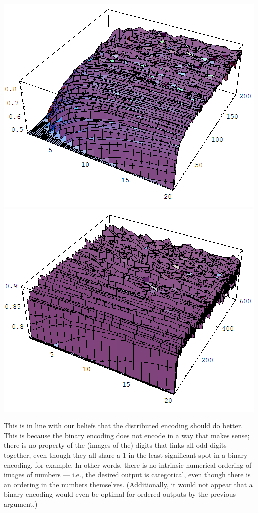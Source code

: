 \documentclass{article}
\begin{document}
\begin{enumerate}
\begin{enumerate}
      \begin{center}
        \includegraphics[scale=.35]{15_binary.png}
        \includegraphics[scale=.35]{15_distributed.png}
      \end{center}

      This is in line with our beliefs that the distributed encoding
      should do better. This is because the binary encoding does not
      encode in a way that makes sense; there is no property of the
      (images of the) digits that links all odd digits together, even
      though they all share a 1 in the least significant spot in a
      binary encoding, for example. In other words, there is no
      intrinsic numerical ordering of images of numbers --- i.e., the
      desired output is categorical, even though there is an ordering
      in the numbers themselves.  (Additionally, it would not appear
      that a binary encoding would even be optimal for ordered outputs
      by the previous argument.)


\end{enumerate}
\end{enumerate}
\end{document}
